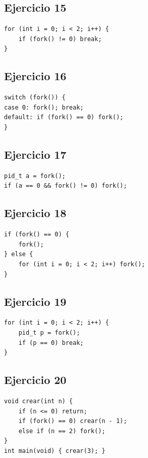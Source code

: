 \documentclass[12pt,a4paper]{article}
\begin{document}
\subsection*{Ejercicio 15}
\begin{lstlisting}
for (int i = 0; i < 2; i++) {
    if (fork() != 0) break;
}
\end{lstlisting}
\subsection*{Ejercicio 16}
\begin{lstlisting}
switch (fork()) {
case 0: fork(); break;
default: if (fork() == 0) fork();
}
\end{lstlisting}
\subsection*{Ejercicio 17}
\begin{lstlisting}
pid_t a = fork();
if (a == 0 && fork() != 0) fork();
\end{lstlisting}
\subsection*{Ejercicio 18}
\begin{lstlisting}
if (fork() == 0) {
    fork();
} else {
    for (int i = 0; i < 2; i++) fork();
}
\end{lstlisting}
\subsection*{Ejercicio 19}
\begin{lstlisting}
for (int i = 0; i < 2; i++) {
    pid_t p = fork();
    if (p == 0) break;
}
\end{lstlisting}
\subsection*{Ejercicio 20}
\begin{lstlisting}
void crear(int n) {
    if (n <= 0) return;
    if (fork() == 0) crear(n - 1);
    else if (n == 2) fork();
}
int main(void) { crear(3); }
\end{lstlisting}
\end{document}

